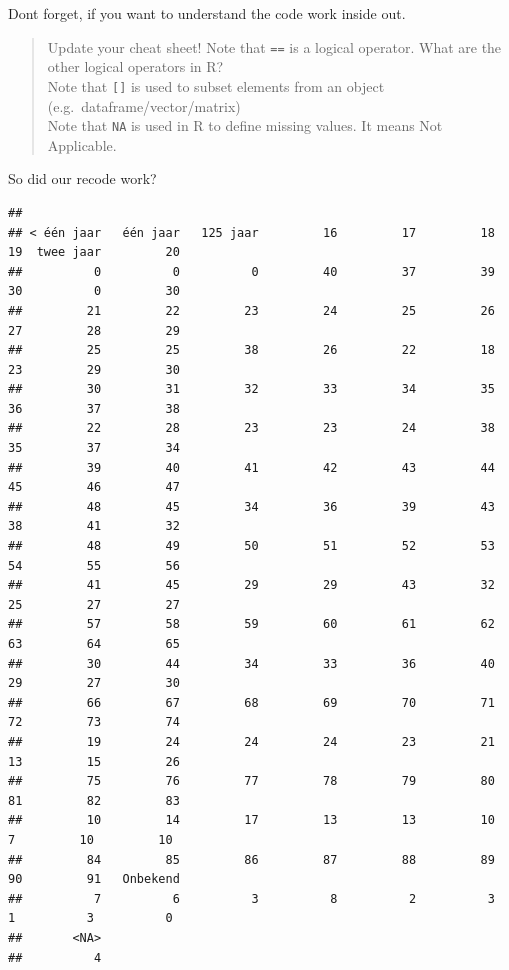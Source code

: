 \documentclass[
]{book}
\newenvironment{Shaded}{\begin{snugshade}}{\end{snugshade}}
\newcommand{\DataTypeTok}[1]{\textcolor[rgb]{0.13,0.29,0.53}{#1}}
\newcommand{\KeywordTok}[1]{\textcolor[rgb]{0.13,0.29,0.53}{\textbf{#1}}}
\newcommand{\NormalTok}[1]{#1}
\newcommand{\OperatorTok}[1]{\textcolor[rgb]{0.81,0.36,0.00}{\textbf{#1}}}
\newcommand{\StringTok}[1]{\textcolor[rgb]{0.31,0.60,0.02}{#1}}
\begin{document}
Dont forget, if you want to understand the code work inside out.

\begin{quote}
Update your cheat sheet! Note that \texttt{==} is a logical operator. What are the other logical operators in R?\\
Note that \texttt{{[}{]}} is used to subset elements from an object (e.g.~dataframe/vector/matrix)\\
Note that \texttt{NA} is used in R to define missing values. It means Not Applicable.
\end{quote}

So did our recode work?

\begin{Shaded}
\end{Shaded}

\begin{verbatim}
## 
## < één jaar   één jaar   125 jaar         16         17         18         19  twee jaar         20 
##          0          0          0         40         37         39         30          0         30 
##         21         22         23         24         25         26         27         28         29 
##         25         25         38         26         22         18         23         29         30 
##         30         31         32         33         34         35         36         37         38 
##         22         28         23         23         24         38         35         37         34 
##         39         40         41         42         43         44         45         46         47 
##         48         45         34         36         39         43         38         41         32 
##         48         49         50         51         52         53         54         55         56 
##         41         45         29         29         43         32         25         27         27 
##         57         58         59         60         61         62         63         64         65 
##         30         44         34         33         36         40         29         27         30 
##         66         67         68         69         70         71         72         73         74 
##         19         24         24         24         23         21         13         15         26 
##         75         76         77         78         79         80         81         82         83 
##         10         14         17         13         13         10          7         10         10 
##         84         85         86         87         88         89         90         91   Onbekend 
##          7          6          3          8          2          3          1          3          0 
##       <NA> 
##          4
\end{verbatim}
\end{document}
